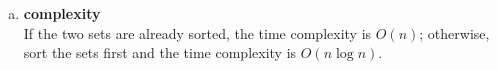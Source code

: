 \begin{enumerate}[a).]
	\item \textbf{complexity} \\
	 If the two sets are already sorted,  the time complexity is $O(n)$;
	 otherwise, sort the sets first and the time complexity is $O(n\log n)$.
	
\end{enumerate}	
